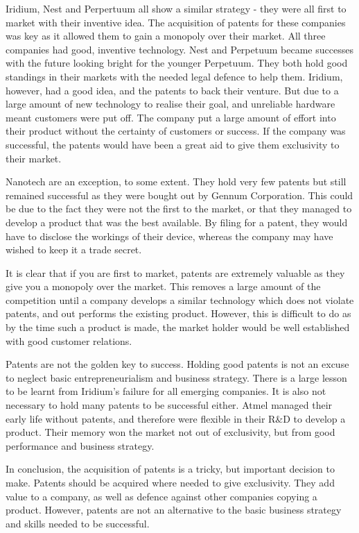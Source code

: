 Iridium, Nest and Perpertuum all show a similar strategy - they were all first to market with their inventive idea.
The acquisition of patents for these companies was key as it allowed them to gain a monopoly over their market. 
All three companies had good, inventive technology.
Nest and Perpetuum became successes with the future looking bright for the younger Perpetuum. 
They both hold good standings in their markets with the needed legal defence to help them.
Iridium, however, had a good idea, and the patents to back their venture. 
But due to a large amount of new technology to realise their goal, and unreliable hardware meant customers were put off.
The company put a large amount of effort into their product without the certainty of customers or success. 
If the company was successful, the patents would have been a great aid to give them exclusivity to their market.

Nanotech are an exception, to some extent.
They hold very few patents \cite{nanotechpatent} but still remained successful as they were bought out by Gennum Corporation. 
This could be due to the fact they were not the first to the market, or that they managed to develop a product that was the best available. 
By filing for a patent, they would have to disclose the workings of their device, whereas the company may have wished to keep it a trade secret.

It is clear that if you are first to market, patents are extremely valuable as they give you a monopoly over the market. 
This removes a large amount of the competition until a company develops a similar technology which does not violate patents, and out performs the existing product. 
However, this is difficult to do as by the time such a product is made, the market holder would be well established with good customer relations.

Patents are not the golden key to success. 
Holding good patents is not an excuse to neglect basic entrepreneurialism and business strategy. 
There is a large lesson to be learnt from Iridium's failure for all emerging companies.
It is also not necessary to hold many patents to be successful either.
Atmel managed their early life without patents, and therefore were flexible in their R\&D to develop a product. 
Their memory won the market not out of exclusivity, but from good performance and business strategy.

In conclusion, the acquisition of patents is a tricky, but important decision to make.
Patents should be acquired where needed to give exclusivity.
They add value to a company, as well as defence against other companies copying a product.
However, patents are not an alternative to the basic business strategy and skills needed to be successful.



